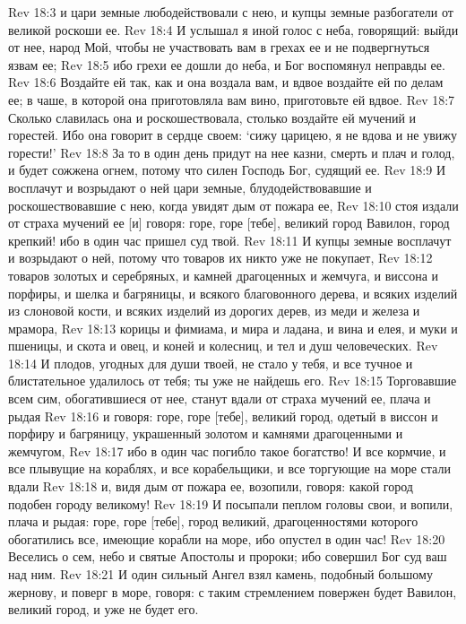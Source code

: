 Rev 18:3  и цари земные любодействовали с нею, и купцы земные разбогатели от великой роскоши ее.
Rev 18:4  И услышал я иной голос с неба, говорящий: выйди от нее, народ Мой, чтобы не участвовать вам в грехах ее и не подвергнуться язвам ее;
Rev 18:5  ибо грехи ее дошли до неба, и Бог воспомянул неправды ее.
Rev 18:6  Воздайте ей так, как и она воздала вам, и вдвое воздайте ей по делам ее; в чаше, в которой она приготовляла вам вино, приготовьте ей вдвое.
Rev 18:7  Сколько славилась она и роскошествовала, столько воздайте ей мучений и горестей. Ибо она говорит в сердце своем: `сижу царицею, я не вдова и не увижу горести!'
Rev 18:8  За то в один день придут на нее казни, смерть и плач и голод, и будет сожжена огнем, потому что силен Господь Бог, судящий ее.
Rev 18:9  И восплачут и возрыдают о ней цари земные, блудодействовавшие и роскошествовавшие с нею, когда увидят дым от пожара ее,
Rev 18:10  стоя издали от страха мучений ее [и] говоря: горе, горе [тебе], великий город Вавилон, город крепкий! ибо в один час пришел суд твой.
Rev 18:11  И купцы земные восплачут и возрыдают о ней, потому что товаров их никто уже не покупает,
Rev 18:12  товаров золотых и серебряных, и камней драгоценных и жемчуга, и виссона и порфиры, и шелка и багряницы, и всякого благовонного дерева, и всяких изделий из слоновой кости, и всяких изделий из дорогих дерев, из меди и железа и мрамора,
Rev 18:13  корицы и фимиама, и мира и ладана, и вина и елея, и муки и пшеницы, и скота и овец, и коней и колесниц, и тел и душ человеческих.
Rev 18:14  И плодов, угодных для души твоей, не стало у тебя, и все тучное и блистательное удалилось от тебя; ты уже не найдешь его.
Rev 18:15  Торговавшие всем сим, обогатившиеся от нее, станут вдали от страха мучений ее, плача и рыдая
Rev 18:16  и говоря: горе, горе [тебе], великий город, одетый в виссон и порфиру и багряницу, украшенный золотом и камнями драгоценными и жемчугом,
Rev 18:17  ибо в один час погибло такое богатство! И все кормчие, и все плывущие на кораблях, и все корабельщики, и все торгующие на море стали вдали
Rev 18:18  и, видя дым от пожара ее, возопили, говоря: какой город подобен городу великому!
Rev 18:19  И посыпали пеплом головы свои, и вопили, плача и рыдая: горе, горе [тебе], город великий, драгоценностями которого обогатились все, имеющие корабли на море, ибо опустел в один час!
Rev 18:20  Веселись о сем, небо и святые Апостолы и пророки; ибо совершил Бог суд ваш над ним.
Rev 18:21  И один сильный Ангел взял камень, подобный большому жернову, и поверг в море, говоря: с таким стремлением повержен будет Вавилон, великий город, и уже не будет его.
